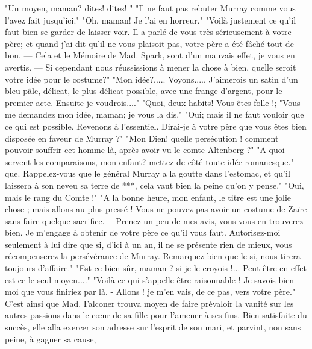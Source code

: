 "Un moyen, maman? dites! dites! "
\setcounter{page}{277} "Il ne faut pas rebuter Murray comme vous l'avez fait jusqu'ici."
"Oh, maman! Je l'ai en horreur."
"Voilà justement ce qu'il faut bien se garder de laisser voir. Il a parlé de vous très-sérieusement à votre père; et quand j'ai dit qu'il ne vous plaisoit pas, votre père a été fâché tout de bon. — Cela et le Mémoire de Mad. Spark, sont d'un mauvais effet, je vous en avertis. — Si cependant nous réussissions à mener la chose à bien, quelle seroit votre idée pour le costume?"
"Mon idée?..... Voyons..... J'aimerois un satin d'un bleu pâle, délicat, le plus délicat possible, avec une frange d'argent, pour le premier acte. Ensuite je voudrois...."
"Quoi, deux habits! Vous êtes folle !;
"Vous me demandez mon idée, maman; je vous la dis."
"Oui; mais il ne faut vouloir que ce qui est possible. Revenons à l'essentiel. Dirai-je à votre père que vous êtes bien disposée en faveur de Murray ?"
"Mon Dien! quelle persécution ! comment pouvoir souffrir cet homme là, après avoir vu le comte Altenberg ?"
"A quoi servent les comparaisons, mon enfant? mettez de côté toute idée romanesque."\setcounter{page}{278} que. Rappelez-vous que le général Murray a la goutte dans l'estomac, et qu'il laissera à son neveu sa terre de ***, cela vaut bien la peine qu'on y pense."
"Oui, mais le rang du Comte !"
"A la bonne heure, mon enfant, le titre est une jolie chose ; mais allons au plus pressé ! Vous ne pouvez pas avoir un costume de Zaïre sans faire quelque sacrifice.— Prenez un peu de mes avis, vous vous en trouverez bien. Je m'engage à obtenir de votre père ce qu'il vous faut. Autorisez-moi seulement à lui dire que si, d'ici à un an, il ne se présente rien de mieux, vous récompenserez la persévérance de Murray. Remarquez bien que le si, nous tirera toujours d'affaire."
"Est-ce bien sûr, maman ?-si je le croyois !... Peut-être en effet est-ce le seul moyen...."
"Voilà ce qui s'appelle être raisonnable ! Je savois bien moi que vous finiriez par là. - Allons ! je m'en vais, de ce pas, vers votre père."
C'est ainsi que Mad. Falconer trouva moyen de faire prévaloir la vanité sur les autres passions dans le cœur de sa fille pour l'amener à ses fins. Bien satisfaite du succès, elle alla exercer son adresse sur l'esprit de son mari, et parvint, non sans peine, à gagner sa cause,\setcounter{page}{279}
